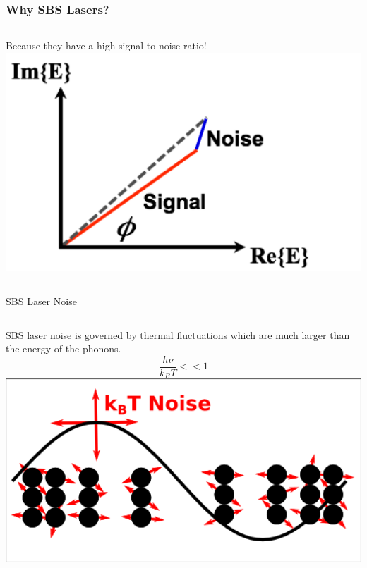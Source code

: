 \documentclass{beamer}
\begin{document}
\begin{frame}\frametitle{Why SBS Lasers?}
\begin{columns}
Because they have a high signal to noise ratio!
\includegraphics[width=1.0\textwidth]{Images/SBS_Noise.png}
\end{columns}

\begin{block}{SBS Laser Noise}
\begin{columns}
SBS laser noise is governed by thermal fluctuations which are much larger than the energy of the phonons.  
$$\frac{h\nu}{k_B T}<<1$$
\includegraphics[width=1.0\textwidth]{Images/Thermal_Noise.png}
\end{columns}
\end{block}
\end{frame}
\end{document}
